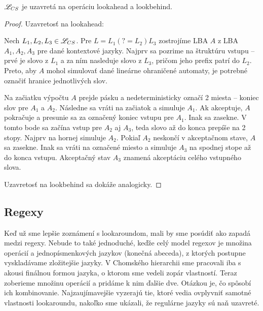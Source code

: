 \begin{veta} \label{CS-lookahead}
$ \mathscr{L}_{CS} $ je uzavretá na operáciu lookahead a lookbehind.
\end{veta} 
\begin{proof}
Uzavretosť na lookahead:

Nech $ L_{1}, L_{2}, L_{3} \in \mathscr{L}_{CS} $. Pre $ L = L_{1}(?=L_{2})L_{3} $ zostrojíme LBA $A$ z LBA $A_1, A_2, A_3$ pre dané kontextové jazyky. Najprv sa pozrime na štruktúru vstupu -- prvé je slovo z $L_1$ a za ním nasleduje slovo z $L_3$, pričom jeho prefix patrí do $L_2$. Preto, aby $A$ mohol simulovať dané lineárne ohraničené automaty, je potrebné označiť hranice jednotlivých slov.

 Na začiatku výpočtu $A$ prejde pásku a nedeterministicky označí 2 miesta -- koniec slov pre $A_1$ a $A_2$. Následne sa vráti na začiatok a simuluje $A_1$. Ak akceptuje, $A$ pokračuje a presunie sa za označený koniec vstupu pre $A_1$. Inak sa zasekne. V tomto bode sa začína vstup pre $A_2$ aj $A_3$, teda slovo až do konca prepíše na 2 stopy. Najprv na hornej simuluje $A_2$. Pokiaľ $A_2$ neskončí v akceptačnom stave, $A$ sa zasekne. Inak sa vráti na označené miesto a simuluje $A_3$ na spodnej stope až do konca vstupu. Akceptačný stav $A_3$ znamená akceptáciu celého vstupného slova.

Uzavretosť na lookbehind sa dokáže analogicky.
\end{proof}

\subsection{Regexy}

Keď už sme lepšie zoznámení s lookaroundom, mali by sme posúdiť ako zapadá medzi regexy. Nebude to také jednoduché, keďže celý model regexov je množina operácií a jednopísmenkových jazykov (konečná abeceda), z ktorých postupne vyskladávame zložitejšie jazyky. V Chomského hierarchii sme pracovali iba s akousi finálnou formou jazyka, o ktorom sme vedeli zopár vlastností. Teraz zoberieme množinu operácií a pridáme k nim ďalšie dve. Otázkou je, čo spôsobí ich kombinovanie. Najzaujímavejšie vyzerajú tie, ktoré vedia ovplyvniť samotné vlastnosti lookaroundu, nakoľko sme ukázali, že regulárne jazyky sú naň uzavreté.


